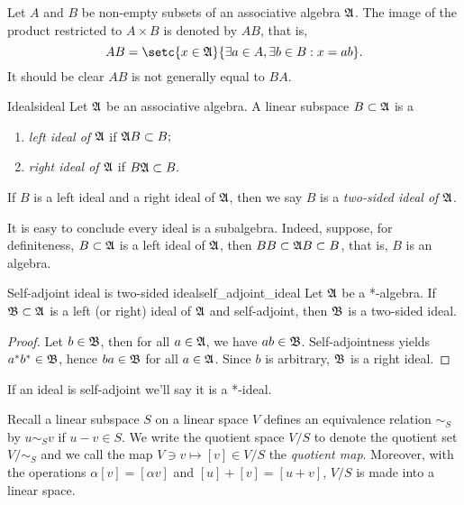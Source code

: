 Let \(A\) and \(B\) be non-empty subsets of an associative algebra \(\mathfrak{A}\). The image of the product restricted to \(A \times B\) is denoted by \(AB\), that is,
\begin{equation*}
    AB = \setc{x \in \algebra{A}}{\exists a \in A, \exists b \in B : x = ab}.
\end{equation*}
It should be clear \(AB\) is not generally equal to \(BA\).
\begin{definition}{Ideals}{ideal}
    Let \(\mathfrak{A}\) be an associative algebra. A linear subspace \(B \subset \mathfrak{A}\) is a
    \begin{enumerate}[label=(\alph*)]
        \item \emph{left ideal of \(\mathfrak{A}\)} if \(\mathfrak{A}B \subset B;\)
        \item \emph{right ideal of \(\mathfrak{A}\)} if \(B\mathfrak{A} \subset B.\)
    \end{enumerate}
    If \(B\) is a left ideal and a right ideal of \(\mathfrak{A}\), then we say \(B\) is a \emph{two-sided ideal of \(\mathfrak{A}\)}.
\end{definition}
\begin{remark}
    It is easy to conclude every ideal is a subalgebra. Indeed, suppose, for definiteness, \(B \subset \mathfrak{A}\) is a left ideal of \(\mathfrak{A}\), then \(BB \subset \mathfrak{A}B \subset B\), that is, \(B\) is an algebra.
\end{remark}

\begin{proposition}{Self-adjoint ideal is two-sided ideal}{self_adjoint_ideal}
    Let \(\mathfrak{A}\) be a *-algebra. If \(\mathfrak{B} \subset \mathfrak{A}\) is a left (or right) ideal of \(\mathfrak{A}\) and self-adjoint, then \(\mathfrak{B}\) is a two-sided ideal.
\end{proposition}
\begin{proof}
    Let \(b \in \mathfrak{B}\), then for all \(a \in \mathfrak{A}\), we have \(ab \in \mathfrak{B}\). Self-adjointness yields \(a^*b^* \in \mathfrak{B}\), hence \(ba \in \mathfrak{B}\) for all \(a \in \mathfrak{A}\). Since \(b\) is arbitrary, \(\mathfrak{B}\) is a right ideal.
\end{proof}
\begin{remark}
    If an ideal is self-adjoint we'll say it is a *-ideal.
\end{remark}

Recall a linear subspace \(S\) on a linear space \(V\) defines an equivalence relation \(\sim_S\) by \(u \sim_S v\) if \(u - v \in S\). We write the quotient space \(V/S\) to denote the quotient set \(V/\sim_S\) and we call the map \(V \ni v \mapsto [v] \in V/S\) the \emph{quotient map}. Moreover, with the operations \(\alpha[v] = [\alpha v]\) and \([u]+[v] = [u+v]\), \(V/S\) is made into a linear space.

